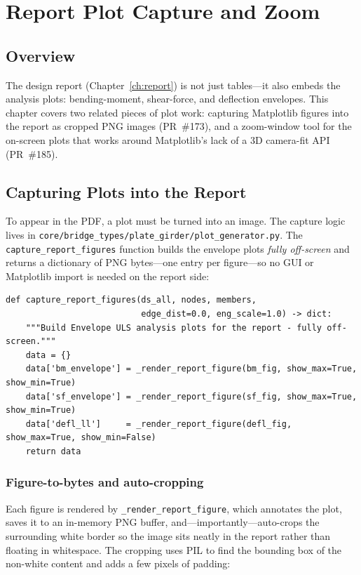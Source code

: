 \chapter{Report Plot Capture and Zoom}
\label{ch:plots}

\section{Overview}
The design report (Chapter~\ref{ch:report}) is not just tables---it also embeds the analysis
plots: bending-moment, shear-force, and deflection envelopes. This chapter covers two related
pieces of plot work: capturing Matplotlib figures into the report as cropped PNG images
(PR~\#173), and a zoom-window tool for the on-screen plots that works around Matplotlib's lack
of a 3D camera-fit API (PR~\#185).

\section{Capturing Plots into the Report}
To appear in the PDF, a plot must be turned into an image. The capture logic lives in
\texttt{core/bridge\_types/plate\_girder/plot\_generator.py}. The
\texttt{capture\_report\_figures} function builds the envelope plots \emph{fully off-screen} and
returns a dictionary of PNG bytes---one entry per figure---so no GUI or Matplotlib import is
needed on the report side:

\begin{lstlisting}[caption={Off-screen capture of the report figures (\texttt{plot\_generator.py}).},label={lst:capture}]
def capture_report_figures(ds_all, nodes, members,
                           edge_dist=0.0, eng_scale=1.0) -> dict:
    """Build Envelope ULS analysis plots for the report - fully off-screen."""
    data = {}
    data['bm_envelope'] = _render_report_figure(bm_fig, show_max=True,  show_min=True)
    data['sf_envelope'] = _render_report_figure(sf_fig, show_max=True,  show_min=True)
    data['defl_ll']     = _render_report_figure(defl_fig, show_max=True, show_min=False)
    return data
\end{lstlisting}

\subsection{Figure-to-bytes and auto-cropping}
Each figure is rendered by \texttt{\_render\_report\_figure}, which annotates the plot, saves it
to an in-memory PNG buffer, and---importantly---auto-crops the surrounding white border so the
image sits neatly in the report rather than floating in whitespace. The cropping uses PIL to
find the bounding box of the non-white content and adds a few pixels of padding:

